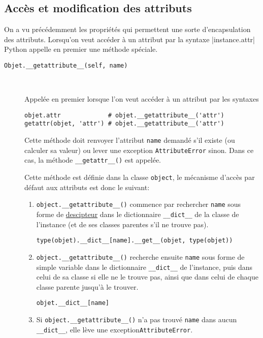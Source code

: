 \subsection{Accès et modification des attributs}
On a vu précédemment les propriétés qui permettent une sorte d'encapsulation des attributs. Lorsqu'on veut accéder à un attribut par la syntaxe |instance.attr| Python appelle en premier une méthode spéciale.

\begin{description}
    \item[\texttt{Objet.__getattribute__(self, name)}]~
    
    Appelée en premier lorsque l'on veut accéder à un attribut par les syntaxes
    \begin{verbatim}
objet.attr             # objet.__getattribute__('attr')
getattr(objet, 'attr') # objet.__getattribute__('attr')
    \end{verbatim} 
    Cette méthode doit renvoyer l'attribut \texttt{name} demandé s'il existe (ou calculer sa valeur) ou lever une exception \texttt{AttributeError} sinon. Dans ce cas, la méthode \texttt{__getattr__()} est appelée.\medskip
    
    Cette méthode est définie dans la classe \texttt{object}, le mécanisme d'accès par défaut aux attributs est
    donc le suivant:
    \begin{enumerate}
        \item \texttt{object.__getattribute__()} commence par rechercher \texttt{name} sous forme de \hyperref[sec:descripteur]{descipteur} dans le dic\-tion\-naire \texttt{__dict__} de la classe de l'instance (et de ses classes parentes s'il ne trouve pas).
        \begin{verbatim}
type(objet).__dict__[name].__get__(objet, type(objet))
        \end{verbatim}
        \item \texttt{object.__getattribute__()} recherche ensuite \texttt{name} sous forme de simple variable dans le dictionnaire \texttt{__dict__} de l'instance, puis dans celui de sa classe si elle ne le trouve pas, ainsi que dans celui de chaque classe parente jusqu'à le trouver.
        \begin{verbatim}
objet.__dict__[name]        
        \end{verbatim}
        \item Si \texttt{object.__getattribute__()} n'a pas trouvé \texttt{name} dans aucun \texttt{__dict__}, elle lève une exception\break \texttt{AttributeError}.
    \end{enumerate}


\end{description}
